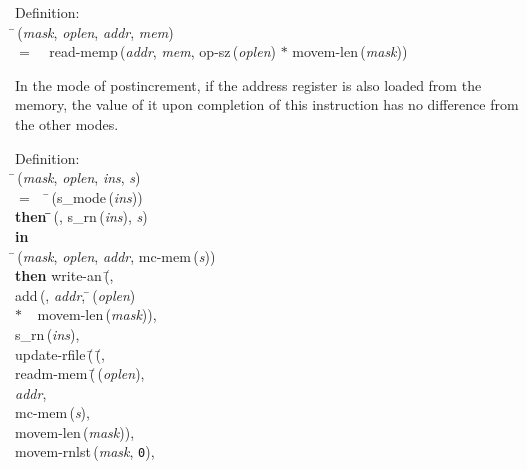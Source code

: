 \begin{tabbing}{\sc Definition}: \\  
\=\,({\it{mask\/}}, {\it{oplen\/}}, {\it{addr\/}}, {\it{mem\/}}) \\ 
$=$$\;\;\;\;${\rm{read-memp}}\,({\it{addr\/}}, {\it{mem\/}}, {\rm{op-sz}}\,({\it{oplen\/}}) $*$ {\rm{movem-len}}\,({\it{mask\/}}))\-
\end{tabbing}

 In the mode of postincrement, if the address register is also loaded
 from the memory, the value of it upon completion of this instruction
 has no difference from the other modes.
\begin{tabbing}{\sc Definition}: \\  
\=\,({\it{mask\/}}, {\it{oplen\/}}, {\it{ins\/}}, {\it{s\/}}) \\ 
$=$$\;\;\;\;$\=\,({\rm{s\_mode}}\,({\it{ins\/}})) \\ 
{\bf then }\=\=\,({}, {\rm{s\_rn}}\,({\it{ins\/}}), {\it{s\/}})\- \\ 
{\bf in} \\ 
\=\,({\it{mask\/}}, {\it{oplen\/}}, {\it{addr\/}}, {\rm{mc-mem}}\,({\it{s\/}})) \\ 
{\bf then }{\rm{write-an}}\,(\=, \\ 
{\rm{add}}\,({}, {\it{addr\/}}, \=\,({\it{oplen\/}}) \\ 
$*$$\;\;\;\;${\rm{movem-len}}\,({\it{mask\/}})\-), \\ 
{\rm{s\_rn}}\,({\it{ins\/}}), \\ 
{\rm{update-rfile}}\,(\=\,(\=, \\ 
{\rm{readm-mem}}\,(\=\,({\it{oplen\/}}), \\ 
{\it{addr\/}}, \\ 
{\rm{mc-mem}}\,({\it{s\/}}), \\ 
{\rm{movem-len}}\,({\it{mask\/}}))\-, \\ 
{\rm{movem-rnlst}}\,({\it{mask\/}}, {\tt{0}}), \\ 

\end{tabbing}
